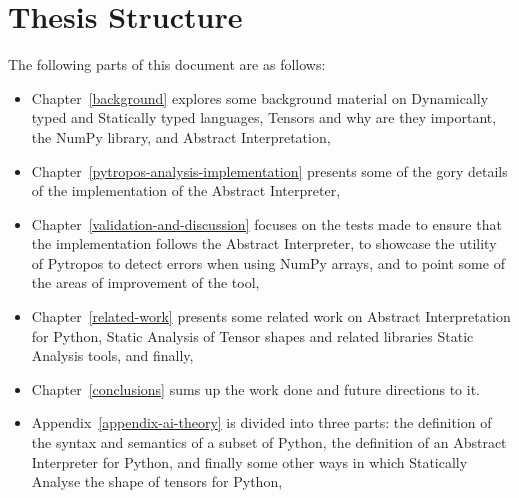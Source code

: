 \section{Thesis Structure}\label{thesis-structure}

The following parts of this document are as follows:

\begin{itemize}
\tightlist
\item
  Chapter~\ref{background} explores some background material on
  Dynamically typed and Statically typed languages, Tensors and why are
  they important, the NumPy library, and Abstract Interpretation,
\item
  Chapter~\ref{pytropos-analysis-implementation} presents some of the
  gory details of the implementation of the Abstract Interpreter,
\item
  Chapter~\ref{validation-and-discussion} focuses on the tests made to
  ensure that the implementation follows the Abstract Interpreter, to
  showcase the utility of Pytropos to detect errors when using NumPy
  arrays, and to point some of the areas of improvement of the tool,
\item
  Chapter~\ref{related-work} presents some related work on Abstract
  Interpretation for Python, Static Analysis of Tensor shapes and
  related libraries Static Analysis tools, and finally,
\item
  Chapter~\ref{conclusions} sums up the work done and future directions
  to it.
\item
  Appendix~\ref{appendix-ai-theory}
  is divided into three parts: the definition of the syntax and
  semantics of a subset of Python, the definition of an Abstract
  Interpreter for Python, and finally some other ways in which
  Statically Analyse the shape of tensors for Python,
\end{itemize}
